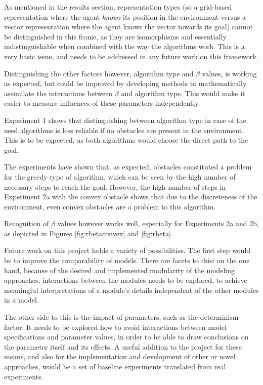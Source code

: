 As mentioned in the results section, representation types (so a grid-based representation where the agent \textit{knows} its position in the environment versus a vector representation where the agent knows the vector towards its goal) cannot be distinguished in this frame,
as they are isomorphisms and essentially indistinguishable when combined with the way the algorithms work.
This is a very basic issue, and needs to be addressed in any future work on this framework.

Distinguishing the other factors however, algorithm type and $\beta$ values, is working as expected, but could be improved by developing methods to mathematically assimilate the interactions between $\beta$ and algorithm type.
This would make it easier to measure influences of these parameters independently.

Experiment 1 shows that distinguishing between algorithm type in case of the used algorithms is less reliable if no obstacles are present in the environment.
This is to be expected, as both algorithms would choose the direct path to the goal.

The experiments have shown that, as expected, obstacles constituted a problem for the greedy type of algorithm, which can be seen by the high number of necessary steps to reach the goal.
However, the high number of steps in Experiment 2a with the convex obstacle shows that due to the discreteness of the environment, even convex obstacles are a problem to this algorithm.

Recognition of $\beta$ values however works well, especially for Experiments 2a and 2b, as depicted in Figures \ref{fig:rbetaconvex} and \ref{fig:rbeta}.

Future work on this project holds a variety of possibilities.
The first step would be to improve the comparability of models.
There are facets to this: on the one hand, because of the desired and implemented modularity of the modeling approaches, interactions between the modules needs to be explored, 
to achieve meaningful interpretations of a module's details independent of the other modules in a model.

The other side to this is the impact of parameters, such as the determinism factor.
It needs to be explored how to avoid interactions between model specifications and parameter values, in order to be able to draw conclusions on the parameter itself and its effects.
A useful addition to the project for these means, and also for the implementation and development of other or novel approaches, would be a set of baseline experiments translated from real experiments.

